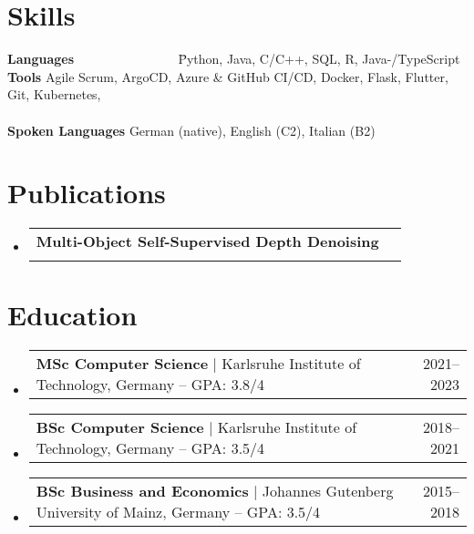 \documentclass[letterpaper,11pt]{article}
\makeatletter
\newcommand{\resumeProjectHeading}[2]{
    \item
    \begin{tabular*}{0.97\textwidth}{l@{\extracolsep{\fill}}r}
      \small#1 & #2 \\
    \end{tabular*}\vspace{-7pt}
}
\newcommand{\resumeSubHeadingListStart}{\begin{itemize}[leftmargin=0.15in, label={}]}
\newcommand{\resumeSubHeadingListEnd}{\end{itemize}}
\makeatother
\begin{document}
\section{Skills}
\begin{itemize}[leftmargin=0.15in, label={}]
	\small{\item{
	      \begin{tabbing}
		      \textbf{Languages} ~~~~~~~~~~~~~~~ \={Python, Java, C/C++, SQL, R, Java-/TypeScript} \\
		      \textbf{Tools} \> {Agile Scrum, ArgoCD, Azure \& GitHub CI/CD, Docker, Flask, Flutter, Git, Kubernetes,  } \\
		       \\
		      \textbf{Spoken Languages} \> {German (native), English (C2), Italian (B2)}
	      \end{tabbing}
	      }}
\end{itemize}

\section{Publications}
\resumeSubHeadingListStart
\resumeProjectHeading{\textbf{Multi-Object Self-Supervised Depth Denoising} \space [Kienle \& Petri, 2023, \href{https://arxiv.org/abs/2305.05778}{{arXiv: 2305.05778}}]}\\
\resumeSubHeadingListEnd

\section{Education}
\resumeSubHeadingListStart
\resumeProjectHeading
{\textbf{MSc Computer Science} \space $|$ \space Karlsruhe Institute of Technology, Germany -- GPA: 3.8/4}{2021--2023}
\resumeProjectHeading
{\textbf{BSc Computer Science} \space $|$ \space Karlsruhe Institute of Technology, Germany -- GPA: 3.5/4}{2018--2021}
\resumeProjectHeading
{\textbf{BSc Business and Economics} \space $|$ \space Johannes Gutenberg University of Mainz, Germany -- GPA: 3.5/4}{2015--2018}
\resumeSubHeadingListEnd

\end{document}
